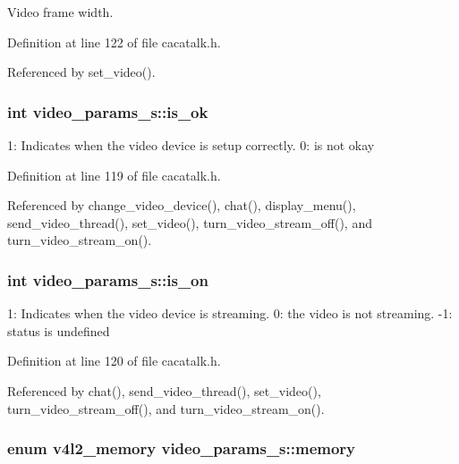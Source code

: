 \-Video frame width. 



\-Definition at line 122 of file cacatalk.\-h.



\-Referenced by set\-\_\-video().

\hypertarget{structvideo__params__s_a244777435afe8e2ffd40d1919e47abcb}{
\subsubsection[{is\-\_\-ok}]{\setlength{\rightskip}{0pt plus 5cm}int {\bf video\-\_\-params\-\_\-s\-::is\-\_\-ok}}}\label{structvideo__params__s_a244777435afe8e2ffd40d1919e47abcb}


1\-: \-Indicates when the video device is setup correctly. 0\-: is not okay 



\-Definition at line 119 of file cacatalk.\-h.



\-Referenced by change\-\_\-video\-\_\-device(), chat(), display\-\_\-menu(), send\-\_\-video\-\_\-thread(), set\-\_\-video(), turn\-\_\-video\-\_\-stream\-\_\-off(), and turn\-\_\-video\-\_\-stream\-\_\-on().

\hypertarget{structvideo__params__s_a09a2674567a028e8984acac16ccc8a8f}{
\subsubsection[{is\-\_\-on}]{\setlength{\rightskip}{0pt plus 5cm}int {\bf video\-\_\-params\-\_\-s\-::is\-\_\-on}}}\label{structvideo__params__s_a09a2674567a028e8984acac16ccc8a8f}


1\-: \-Indicates when the video device is streaming. 0\-: the video is not streaming. -\/1\-: status is undefined 



\-Definition at line 120 of file cacatalk.\-h.



\-Referenced by chat(), send\-\_\-video\-\_\-thread(), set\-\_\-video(), turn\-\_\-video\-\_\-stream\-\_\-off(), and turn\-\_\-video\-\_\-stream\-\_\-on().

\hypertarget{structvideo__params__s_ac54e2e0bd136b84eff239a49a8b11afa}{
\subsubsection[{memory}]{\setlength{\rightskip}{0pt plus 5cm}enum v4l2\-\_\-memory {\bf video\-\_\-params\-\_\-s\-::memory}}}\label{structvideo__params__s_ac54e2e0bd136b84eff239a49a8b11afa}


